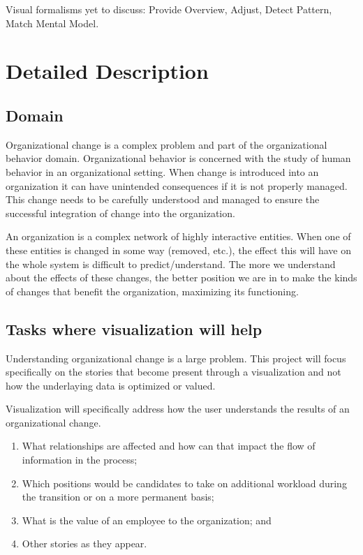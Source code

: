 \documentclass{soups}
\begin{document}
Visual formalisms yet to discuss: Provide Overview, Adjust, Detect Pattern, Match Mental Model\cite{yi2007toward}.






\section{Detailed Description}

\subsection{Domain}

Organizational change is a complex problem and part of the organizational behavior domain.  Organizational behavior is concerned with the study of human behavior in an organizational setting.  When change is introduced into an organization it can have unintended consequences if it is not properly managed.  This change needs to be carefully understood and managed to ensure the successful integration of change into the organization.

An organization is a complex network of highly interactive entities. When one of these entities is changed in some way (removed, etc.), the effect this will have on the whole system is difficult to predict/understand. The more we understand about the effects of these changes, the better position we are in to make the kinds of changes that benefit the organization, maximizing its functioning.

\subsection{Tasks where visualization will help}

Understanding organizational change is a large problem.  This project will focus specifically on the stories that become present through a visualization and not how the underlaying data is optimized or valued.

Visualization will specifically address how the user understands the results of an organizational change.

\begin{enumerate}
\item What relationships are affected and how can that impact the flow of information in the process;
\item Which positions would be candidates to take on additional workload during the transition or on a more permanent basis;
\item What is the value of an employee to the organization; and
\item Other stories as they appear.
\end{enumerate}
\end{document}
